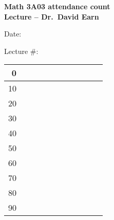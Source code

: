 \documentclass[12pt]{article}
\newcommand{\attendancetableline}[1]{#1 & & & & & & & & & & \\ \hline}
\newcommand{\attendancetable}{%
\begin{tabularx}{0.75\textwidth}{ r | X | X | X | X | X || X | X | X | X | X |}
  \hline
  \attendancetableline{0}
  \attendancetableline{10}
  \attendancetableline{20}
  \attendancetableline{30}
  \attendancetableline{40}
  \attendancetableline{50}
  \attendancetableline{60}
  \attendancetableline{70}
  \attendancetableline{80}
  \attendancetableline{90}
\end{tabularx}
}
\begin{document}
\Huge

\begin{center}
\bfseries 
Math 3A03 attendance count\\
\Large\smallskip
Lecture -- Dr.~David Earn
\end{center}

\medskip
Date: \underline{\hspace{10cm}}

\medskip

\medskip
Lecture \#: \underline{\hspace{2.5cm}}

\vspace{1in}
\begin{center}
\attendancetable
\end{center}
\end{document}
